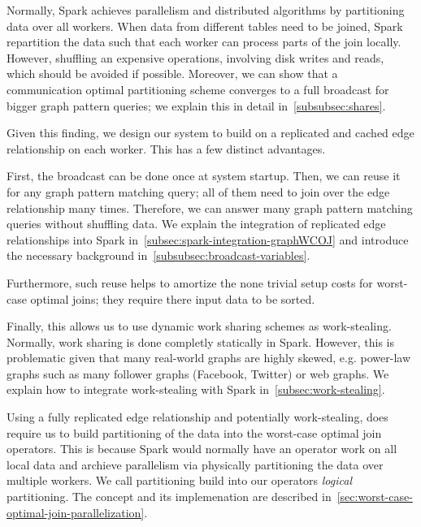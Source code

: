 Normally, Spark achieves parallelism and distributed algorithms by partitioning data over all workers.
When data from different tables need to be joined, Spark repartition the data such that each worker can process parts of the join locally.
However, shuffling an expensive operations, involving disk writes and reads, which should be avoided if possible.
Moreover, we can show that a communication optimal partitioning scheme converges to a full broadcast for bigger graph pattern queries;
we explain this in detail in~\cref{subsubsec:shares}.

Given this finding, we design our system to build on a replicated and cached edge relationship on each worker.
This has a few distinct advantages.


First, the broadcast can be done once at system startup.
Then, we can reuse it for any graph pattern matching query;
all of them need to join over the edge relationship many times.
Therefore, we can answer many graph pattern matching queries without shuffling data.
We explain the integration of replicated edge relationships into Spark in~\cref{subsec:spark-integration-graphWCOJ} and introduce
the necessary background in~\cref{subsubsec:broadcast-variables}.

Furthermore, such reuse helps to amortize the none trivial setup costs for worst-case optimal joins;
they require there input data to be sorted.

Finally, this allows us to use dynamic work sharing schemes as work-stealing.
Normally, work sharing is done completly statically in Spark.
However, this is problematic given that many real-world graphs are highly skewed, e.g. power-law graphs such as many follower graphs
(Facebook, Twitter) or web graphs.
We explain how to integrate work-stealing with Spark in~\cref{subsec:work-stealing}.

Using a fully replicated edge relationship and potentially work-stealing, does require us to build partitioning of the data into the
worst-case optimal join operators.
This is because Spark would normally have an operator work on all local data and archieve parallelism via physically partitioning the
data over multiple workers.
We call partitioning build into our operators \textit{logical} partitioning.
The concept and its implemenation are described in~\cref{sec:worst-case-optimal-join-parallelization}.

